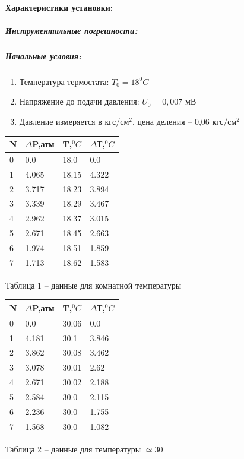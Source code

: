 \documentclass[a4paper,12pt]{article} %
\begin{document}
\paragraph{Характеристики установки:}
\subparagraph{Инструментальные погрешности:}
\subparagraph{Начальные условия:}
\begin{enumerate}
\item Температура термостата: $T_0 = 18^0 C$
\item Напряжение до подачи давления: $U_0 = 0,007$ мВ
\item Давление измеряется в кгс/см$^2$, цена деления -- 0,06 кгс/см$^2$
\end{enumerate}
\begin{minipage}{0.5\textwidth}
  \begin{flushleft}

	\begin{tabular}{ | l | l | l | l |}
\hline
N & $\Delta$P,атм &T,$^0C$ & $\Delta$Т,$^0C$ \\ \hline
0 & 0.0 & 18.0 & 0.0 \\
1 & 4.065 & 18.15 & 4.322 \\
2 & 3.717 & 18.23 & 3.894 \\
3 & 3.339 & 18.29 & 3.467 \\
4 & 2.962 & 18.37 & 3.015 \\
5 & 2.671 & 18.45 & 2.663 \\
6 & 1.974 & 18.51 & 1.859 \\
7 & 1.713 & 18.62 & 1.583 \\
\hline
\end{tabular}


Таблица 1 -- данные для комнатной температуры
  \end{flushleft}
\end{minipage}
\begin{minipage}{0.5\textwidth}
  \begin{flushright}
	\begin{tabular}{ | l | l | l | l |}
\hline
N & $\Delta$P,атм &T,$^0C$ & $\Delta$Т,$^0C$ \\ \hline
0 & 0.0 & 30.06 & 0.0 \\
1 & 4.181 & 30.1 & 3.846 \\
2 & 3.862 & 30.08 & 3.462 \\
3 & 3.078 & 30.01 & 2.62 \\
4 & 2.671 & 30.02 & 2.188 \\
5 & 2.584 & 30.0 & 2.115 \\
6 & 2.236 & 30.0 & 1.755 \\
7 & 1.568 & 30.0 & 1.082 \\
\hline
\end{tabular}

 
Таблица 2 -- данные для температуры $\simeq 30$
  \end{flushright}
\end{minipage}
\end{document}
